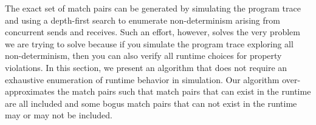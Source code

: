 The exact set of match pairs can be generated by simulating the program trace and using a depth-first search to enumerate non-determinism arising from concurrent sends and receives. Such an effort, however, solves the very problem we are trying to solve because if you simulate the program trace exploring all non-determinism, then you can also verify all runtime choices for property violations. In this section, we present an algorithm that does not require an exhaustive enumeration of runtime behavior in simulation. Our algorithm over-approximates the match pairs such that match pairs that can exist in the runtime are all included and some bogus match pairs that can not exist in the runtime may or may not be included. %

